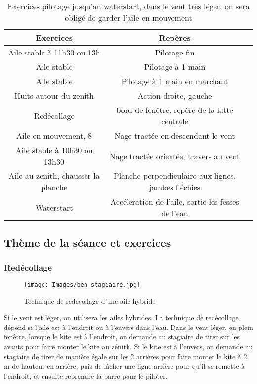 \documentclass[11pt,a4paper]{report}
\begin{document}
\begin{table}
\begin{tabular}{|c|c|c|}
\hline
\textbf{Exercices}     &  \textbf{Repères}      \\
\hline 
Aile stable à 11h30 ou 13h & Pilotage fin  \\
\hline
Aile stable               & Pilotage à 1 main \\
\hline 
Aile stable               & Pilotage à 1 main en marchant \\
\hline 
Huits autour du zenith & Action droite, gauche  \\
\hline
Redécollage            & bord de fen\^etre, repère de la latte centrale \\
\hline
Aile en mouvement, 8      & Nage tractée en descendant le vent \\
\hline 
Aile stable à 10h30 ou 13h30   	& Nage tractée orientée, travers au vent \\
\hline
Aile au zenith, chausser la planche  & Planche perpendiculaire aux lignes, jambes fléchies \\
\hline
Waterstart                           &  Accéleration de l'aile, sortie les fesses de l'eau \\
\hline
\end{tabular}
\caption{Exercices pilotage jusqu'au waterstart, dans le vent très léger, on sera obligé de garder l'aile en mouvement\label{seance_pilotage}}
\end{table}

\subsection{Thème de la séance et exercices}


\subsubsection{Redécollage}
\begin{figure}[h]
\centering
\texttt{[image: Images/ben\_stagiaire.jpg]}
\caption{Technique de redecollage d'une aile hybride\label{redecollage}} 
\end{figure}

Si le vent est léger, on utilisera les ailes hybrides. La technique
de redécollage dépend si l'aile est à l'endroit ou à l'envers dans l'eau.
Dans le vent léger, en plein fen\^etre, lorsque
le kite est à l'endroit, on demande au stagiaire de tirer  sur les avants
pour faire monter le kite au zénith. 
Si le kite est à l'envers, on demande au stagiaire de tirer de manière
égale sur les 2 arrières pour faire monter le kite à 2 m de hauteur en arrière, 
puis de lâcher une ligne arrière pour qu'il se remette à l'endroit,
et ensuite reprendre la barre pour le piloter.
\end{document}
